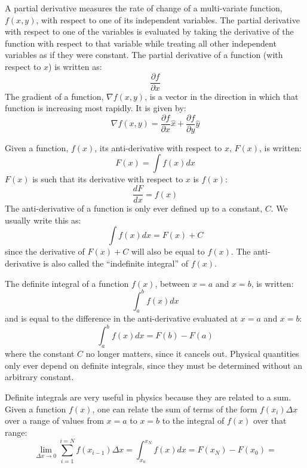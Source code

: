 A partial derivative measures the rate of change of a multi-variate function, $f(x,y)$, with respect to one of its independent variables. The partial derivative with respect to one of the variables is evaluated by taking the derivative of the function with respect to that variable while treating all other independent variables as if they were constant. The partial derivative of a function (with respect to $x$) is written as:
\begin{equation}
\frac{\partial f}{\partial x}
\end{equation}
The gradient of a function, $\nabla f(x,y)$, is a vector in the direction in which that function is increasing most rapidly. It is given by:
\begin{equation}
\nabla f(x,y)=\frac{\partial f}{\partial x}\hat x + \frac{\partial f}{\partial y} \hat y
\end{equation}

Given a function, $f(x)$, its anti-derivative with respect to $x$, $F(x)$, is written:
\begin{equation}
F(x) = \int f(x) dx
\end{equation}
$F(x)$ is such that its derivative with respect to $x$ is $f(x)$:
\begin{equation}
\frac{dF}{dx}=f(x)
\end{equation}
The anti-derivative of a function is only ever defined up to a constant, $C$. We usually write this as:
\begin{equation}
\int f(x) dx = F(x) + C
\end{equation}
since the derivative of $F(x) +C$ will also be equal to $f(x)$. The anti-derivative is also called the ``indefinite integral'' of $f(x)$.

The definite integral of a function $f(x)$, between $x=a$ and $x=b$, is written:
\begin{equation}
\int_a^b f(x) dx
\end{equation}
and is equal to the difference in the anti-derivative evaluated at $x=a$ and $x=b$:
\begin{equation}
\int_a^b f(x) dx = F(b) - F(a)
\end{equation}
where the constant $C$ no longer matters, since it cancels out. Physical quantities only ever depend on definite integrals, since they must be determined without an arbitrary constant.

Definite integrals are very useful in physics because they are related to a sum. Given a function $f(x)$, one can relate the sum of terms of the form $f(x_i)\Delta x$ over a range of values from $x=a$ to $x=b$ to the integral of $f(x)$ over that range:
\begin{equation}
\lim_{\Delta x\to 0}\sum_{i=1}^{i=N} f(x_{i-1}) \Delta x = \int_{x_0}^{x_N}f(x) dx=F(x_N) - F(x_0)=
\end{equation}

